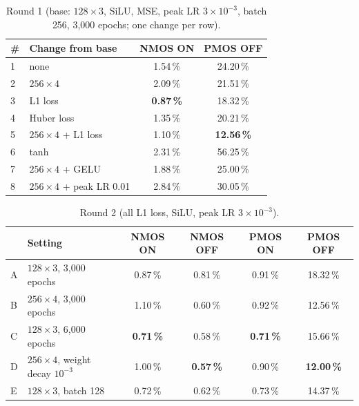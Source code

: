 \documentclass[11pt,a4paper]{article}
\begin{document}
\begin{table}[!htbp]
\centering
\small
\caption{Round 1 (base: $128\times3$, SiLU, MSE, peak LR $3\times10^{-3}$, batch 256, 3,000 epochs; one change per row).}
\begin{tabular}{llcc}
\toprule
\# & Change from base & NMOS ON & PMOS OFF \\
\midrule
1 & none                      & 1.54\,\% & 24.20\,\% \\
2 & $256\times4$              & 2.09\,\% & 21.51\,\% \\
3 & L1 loss                   & \textbf{0.87\,\%} & 18.32\,\% \\
4 & Huber loss                & 1.35\,\% & 20.21\,\% \\
5 & $256\times4$ + L1 loss    & 1.10\,\% & \textbf{12.56\,\%} \\
6 & tanh                      & 2.31\,\% & 56.25\,\% \\
7 & $256\times4$ + GELU       & 1.88\,\% & 25.00\,\% \\
8 & $256\times4$ + peak LR 0.01 & 2.84\,\% & 30.05\,\% \\
\bottomrule
\end{tabular}
\end{table}

\begin{table}[!htbp]
\centering
\small
\caption{Round 2 (all L1 loss, SiLU, peak LR $3\times10^{-3}$).}
\begin{tabular}{llcccc}
\toprule
 & Setting & NMOS ON & NMOS OFF & PMOS ON & PMOS OFF \\
\midrule
A & $128\times3$, 3,000 epochs          & 0.87\,\% & 0.81\,\% & 0.91\,\% & 18.32\,\% \\
B & $256\times4$, 3,000 epochs          & 1.10\,\% & 0.60\,\% & 0.92\,\% & 12.56\,\% \\
C & $128\times3$, 6,000 epochs          & \textbf{0.71\,\%} & 0.58\,\% & \textbf{0.71\,\%} & 15.66\,\% \\
D & $256\times4$, weight decay $10^{-3}$ & 1.00\,\% & \textbf{0.57\,\%} & 0.90\,\% & \textbf{12.00\,\%} \\
E & $128\times3$, batch 128             & 0.72\,\% & 0.62\,\% & 0.73\,\% & 14.37\,\% \\
\bottomrule
\end{tabular}
\end{table}
\end{document}
